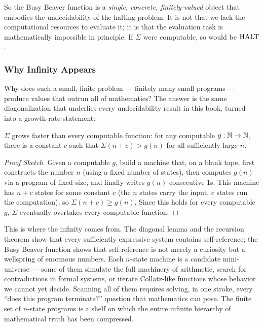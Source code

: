 So the Busy Beaver function is a \emph{single, concrete, finitely-valued} object that embodies the undecidability of the halting problem. It is not that we lack the computational resources to evaluate it; it is that the evaluation task is mathematically impossible in principle. If $\Sigma$ were computable, so would be $\text{HALT}$.

\subsubsection*{Why Infinity Appears}

Why does such a small, finite problem --- finitely many small programs --- produce values that outrun all of mathematics? The answer is the same diagonalization that underlies every undecidability result in this book, turned into a growth-rate statement:

\begin{theorem}
$\Sigma$ grows faster than every computable function: for any computable $g: \mathbb{N} \to \mathbb{N}$, there is a constant $c$ such that $\Sigma(n+c) > g(n)$ for all sufficiently large $n$.
\end{theorem}

\begin{proof}[Proof Sketch]
Given a computable $g$, build a machine that, on a blank tape, first constructs the number $n$ (using a fixed number of states), then computes $g(n)$ via a program of fixed size, and finally writes $g(n)$ consecutive 1s. This machine has $n + c$ states for some constant $c$ (the $n$ states carry the input, $c$ states run the computation), so $\Sigma(n+c) \ge g(n)$. Since this holds for every computable $g$, $\Sigma$ eventually overtakes every computable function.
\end{proof}

This is where the infinity comes from. The diagonal lemma and the recursion theorem show that every sufficiently expressive system contains self-reference; the Busy Beaver function shows that self-reference is not merely a curiosity but a wellspring of enormous numbers. Each $n$-state machine is a candidate mini-universe --- some of them simulate the full machinery of arithmetic, search for contradictions in formal systems, or iterate Collatz-like functions whose behavior we cannot yet decide. Scanning all of them requires solving, in one stroke, every ``does this program terminate?'' question that mathematics can pose. The finite set of $n$-state programs is a shelf on which the entire infinite hierarchy of mathematical truth has been compressed.

